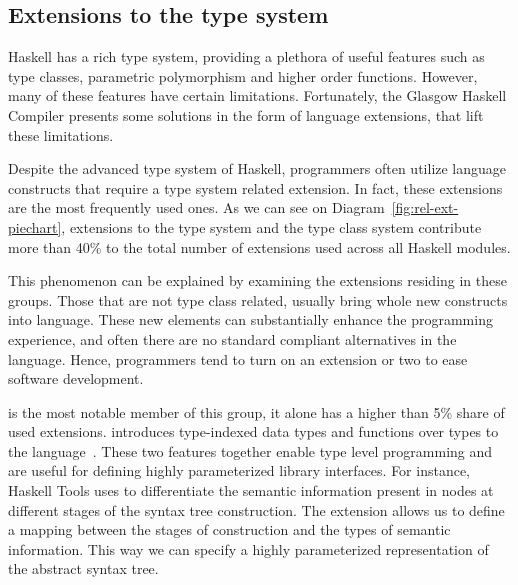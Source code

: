 \documentclass[main.tex]{subfiles}
\begin{document}
	\subsection{Extensions to the type system} \label{type-system-exts}
	
	Haskell has a rich type system, providing a plethora of useful features such as type classes, parametric polymorphism and higher order functions. However, many of these features have certain limitations. Fortunately, the Glasgow Haskell Compiler presents some solutions in the form of language extensions, that lift these limitations. 
	
	Despite the advanced type system of Haskell, programmers often utilize language constructs that require a type system related extension. In fact, these extensions are the most frequently used ones. As we can see on Diagram~\ref{fig:rel-ext-piechart}, extensions to the type system and the type class system contribute more than 40\% to the total number of extensions used across all Haskell modules.
	
	This phenomenon can be explained by examining the extensions residing in these groups. Those that are not type class related, usually bring whole new constructs into language. These new elements can substantially enhance the programming experience, and often there are no standard compliant alternatives in the language. Hence, programmers tend to turn on an extension or two to ease software development.
	
	 is the most notable member of this group, it alone has a higher than 5\% share of used extensions.  introduces type-indexed data types and functions over types to the language~\cite{type-families}. These two features together enable type level programming and are useful for defining highly parameterized library interfaces. For instance, Haskell Tools uses  to differentiate the semantic information present in nodes at different stages of the syntax tree construction. The extension allows us to define a mapping between the stages of construction and the types of semantic information. This way we can specify a highly parameterized representation of the abstract syntax tree.
	
\end{document}
